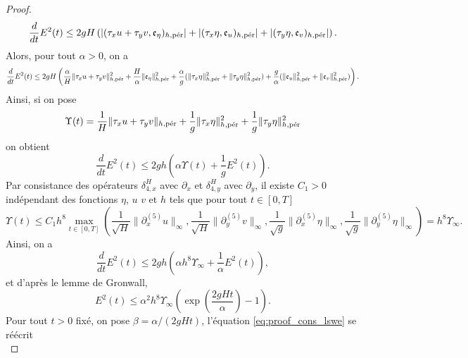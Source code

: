 \begin{proof}
\begin{equation}
\dfrac{d}{dt} E^2(t) \leq 2 g H \left( |(\tau_x u + \tau_y v, \mathfrak{e}_{\eta})_{h,\per}| + |(\tau_x \eta, \mathfrak{e}_u )_{h,\per}| + |(\tau_y \eta, \mathfrak{e}_v )_{h,\per}|  \right).
\end{equation}
Alors, pour tout $\alpha >0$, on a
\begin{equation}
\dfrac{d}{dt}E^2(t) \leq \\
2 gH \left( \dfrac{\alpha}{H} \| \tau_x u + \tau_y v \|_{h,\per}^2 + \dfrac{H}{\alpha} \| \mathfrak{e}_{\eta} \|_{h,\per}^2
+ \dfrac{\alpha}{g} (\| \tau_x \eta \|_{h,\per}^2 + \| \tau_y \eta \|_{h,\per}^2 ) + \dfrac{g}{\alpha} (\| \mathfrak{e}_u \|_{h,\per}^2 + \| \mathfrak{e}_v \|_{h,\per}^2)  \right).
\end{equation}
Ainsi, si on pose 
\begin{equation}
\Upsilon(t) = \dfrac{1}{H} \| \tau_x u + \tau_y v \|_{h,\per} + \dfrac{1}{g} \| \tau_x \eta \|_{h,\per}^2 + \dfrac{1}{g} \| \tau_y \eta \|_{h,\per}^2
\end{equation}
on obtient
\begin{equation}
\dfrac{d}{dt}E^2(t) \leq 2gh \left( \alpha \Upsilon(t) + \dfrac{1}{g} E^2(t) \right).
\end{equation}
Par consistance des opérateurs $\delta_{4,x}^H$ avec $\partial_x$ et $\delta_{4,y}^H$ avec $\partial_y$, il existe $C_1>0$ indépendant des fonctions $\eta$, $u$ $v$ et $h$ tels que pour tout $t \in [0,T]$
\begin{equation}
\Upsilon(t) \leq C_1 h^8 \max_{t \in [0,T]} \left( \dfrac{1}{\sqrt{H}} \| \partial_x^{(5)} u \|_{\infty}, \dfrac{1}{\sqrt{H}} \| \partial_y^{(5)} v \|_{\infty}, \dfrac{1}{\sqrt{g}} \| \partial_x^{(5)} \eta \|_{\infty}, \dfrac{1}{\sqrt{g}} \| \partial_y^{(5)} \eta \|_{\infty}  \right) = h^8 \Upsilon_{\infty}.
\end{equation}
Ainsi, on a
\begin{equation}
\dfrac{d}{dt}E^2(t) \leq 2gh \left( \alpha h^8 \Upsilon_{\infty} + \dfrac{1}{\alpha} E^2(t) \right),
\label{eq:proof_cons_lswe}
\end{equation}
et d'après le lemme de Gronwall,
\begin{equation}
E^2(t) \leq \alpha^2 h^8 \Upsilon_{\infty} \left( \exp \left( \dfrac{2gHt}{\alpha}  \right) -1 \right).
\end{equation}
Pour tout $t>0$ fixé, on pose $\beta = \alpha /(2gHt)$, l'équation \eqref{eq:proof_cons_lswe} se réécrit
\begin{equation}

\end{equation}
\end{proof}
